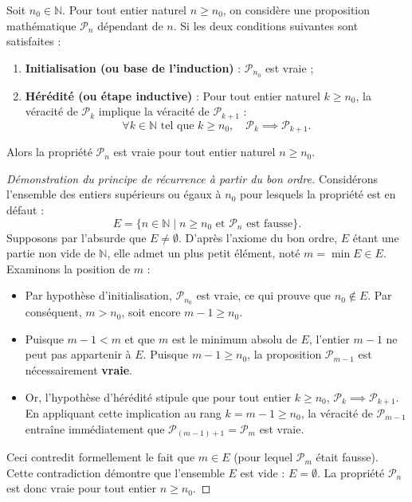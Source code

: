 \documentclass[11pt,a4paper]{article}
\newcommand{\N}{\mathbb{N}}
\begin{document}
\begin{theoremebox}
Soit $n_0 \in \N$. Pour tout entier naturel $n \ge n_0$, on considère une proposition mathématique $\mathcal{P}_n$ dépendant de $n$.
Si les deux conditions suivantes sont satisfaites :
\begin{enumerate}[label=(\arabic*)]
    \item \textbf{Initialisation (ou base de l'induction)} : $\mathcal{P}_{n_0}$ est vraie ;
    \item \textbf{Hérédité (ou étape inductive)} : Pour tout entier naturel $k \ge n_0$, la véracité de $\mathcal{P}_k$ implique la véracité de $\mathcal{P}_{k+1}$ :
    \[
    \forall k \in \N \text{ tel que } k \ge n_0, \quad \mathcal{P}_k \implies \mathcal{P}_{k+1}.
    \]
\end{enumerate}
Alors la propriété $\mathcal{P}_n$ est vraie pour tout entier naturel $n \ge n_0$.
\end{theoremebox}

\begin{proof}[Démonstration du principe de récurrence à partir du bon ordre]
Considérons l'ensemble des entiers supérieurs ou égaux à $n_0$ pour lesquels la propriété est en défaut :
\[
E = \{ n \in \N \mid n \ge n_0 \text{ et } \mathcal{P}_n \text{ est fausse} \}.
\]
Supposons par l'absurde que $E \neq \emptyset$.
D'après l'axiome du bon ordre, $E$ étant une partie non vide de $\N$, elle admet un plus petit élément, noté $m = \min E \in E$.
Examinons la position de $m$ :
\begin{itemize}
    \item Par hypothèse d'initialisation, $\mathcal{P}_{n_0}$ est vraie, ce qui prouve que $n_0 \notin E$. Par conséquent, $m > n_0$, soit encore $m - 1 \ge n_0$.
    \item Puisque $m - 1 < m$ et que $m$ est le minimum absolu de $E$, l'entier $m - 1$ ne peut pas appartenir à $E$. Puisque $m-1 \ge n_0$, la proposition $\mathcal{P}_{m-1}$ est nécessairement \textbf{vraie}.
    \item Or, l'hypothèse d'hérédité stipule que pour tout entier $k \ge n_0$, $\mathcal{P}_k \implies \mathcal{P}_{k+1}$. En appliquant cette implication au rang $k = m - 1 \ge n_0$, la véracité de $\mathcal{P}_{m-1}$ entraîne immédiatement que $\mathcal{P}_{(m-1)+1} = \mathcal{P}_m$ est vraie.
\end{itemize}
Ceci contredit formellement le fait que $m \in E$ (pour lequel $\mathcal{P}_m$ était fausse).
Cette contradiction démontre que l'ensemble $E$ est vide : $E = \emptyset$.
La propriété $\mathcal{P}_n$ est donc vraie pour tout entier $n \ge n_0$.
\end{proof}
\end{document}
